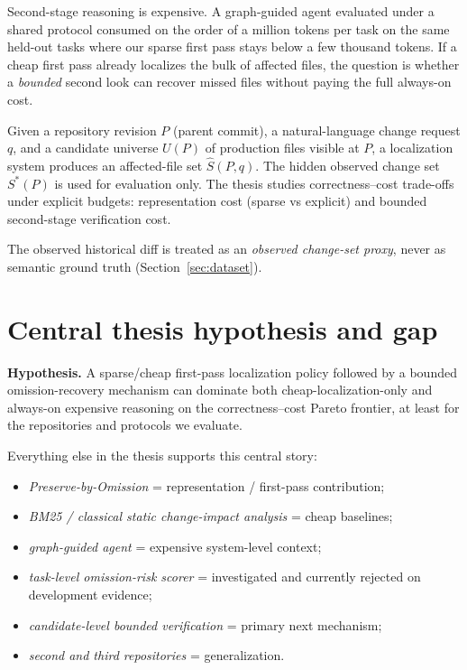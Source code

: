 \documentclass[11pt,a4paper]{article}
\begin{document}
Second-stage reasoning is expensive. A graph-guided agent evaluated under a
shared protocol consumed on the order of a million tokens per task on the same
held-out tasks where our sparse first pass stays below a few thousand tokens.
If a cheap first pass already localizes the bulk of affected files, the
question is whether a \emph{bounded} second look can recover missed files
without paying the full always-on cost.

Given a repository revision $P$ (parent commit), a natural-language change
request $q$, and a candidate universe $U(P)$ of production files visible at
$P$, a localization system produces an affected-file set $\hat{S}(P,q)$. The
hidden observed change set $S^*(P)$ is used for evaluation only. The thesis
studies correctness--cost trade-offs under explicit budgets: representation
cost (sparse vs explicit) and bounded second-stage verification cost.

The observed historical diff is treated as an \emph{observed change-set proxy},
never as semantic ground truth (Section~\ref{sec:dataset}).

\section{Central thesis hypothesis and gap}
\label{sec:hypothesis}

\textbf{Hypothesis.} A sparse/cheap first-pass localization policy followed by
a bounded omission-recovery mechanism can dominate both cheap-localization-only
and always-on expensive reasoning on the correctness--cost Pareto frontier, at
least for the repositories and protocols we evaluate.

Everything else in the thesis supports this central story:

\begin{itemize}
  \item \emph{Preserve-by-Omission} = representation / first-pass contribution;
  \item \emph{BM25 / classical static change-impact analysis} = cheap baselines;
  \item \emph{graph-guided agent} = expensive system-level context;
  \item \emph{task-level omission-risk scorer} = investigated and currently
        rejected on development evidence;
  \item \emph{candidate-level bounded verification} = primary next mechanism;
  \item \emph{second and third repositories} = generalization.
\end{itemize}
\end{document}

